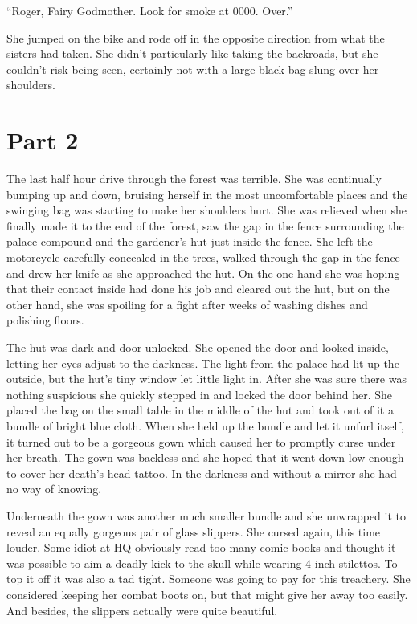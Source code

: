 \documentclass[11pt,letterpaper]{article}
\begin{document}
``Roger, Fairy Godmother. Look for smoke at 0000. Over.''

She jumped on the bike and rode off in the opposite direction from what the sisters had taken. She didn't particularly like taking the backroads, but she couldn't risk being seen, certainly not with a large black bag slung over her shoulders.

\section*{Part 2}

The last half hour drive through the forest was terrible. She was continually bumping up and down, bruising herself in the most uncomfortable places and the swinging bag was starting to make her shoulders hurt. She was relieved when she finally made it to the end of the forest, saw the gap in the fence surrounding the palace compound and the gardener's hut just inside the fence. She left the motorcycle carefully concealed in the trees, walked through the gap in the fence and drew her knife as she approached the hut. On the one hand she was hoping that their contact inside had done his job and cleared out the hut, but on the other hand, she was spoiling for a fight after weeks of washing dishes and polishing floors.

The hut was dark and door unlocked. She opened the door and looked inside, letting her eyes adjust to the darkness. The light from the palace had lit up the outside, but the hut's tiny window let little light in. After she was sure there was nothing suspicious she quickly stepped in and locked the door behind her. She placed the bag on the small table in the middle of the hut and took out of it a bundle of bright blue cloth. When she held up the bundle and let it unfurl itself, it turned out to be a gorgeous gown which caused her to promptly curse under her breath. The gown was backless and she hoped that it went down low enough to cover her death's head tattoo. In the darkness and without a mirror she had no way of knowing.

Underneath the gown was another much smaller bundle and she unwrapped it to reveal an equally gorgeous pair of glass slippers. She cursed again, this time louder. Some idiot at HQ obviously read too many comic books and thought it was possible to aim a deadly kick to the skull while wearing 4-inch stilettos. To top it off it was also a tad tight. Someone was going to pay for this treachery. She considered keeping her combat boots on, but that might give her away too easily. And besides, the slippers actually were quite beautiful.
\end{document}
